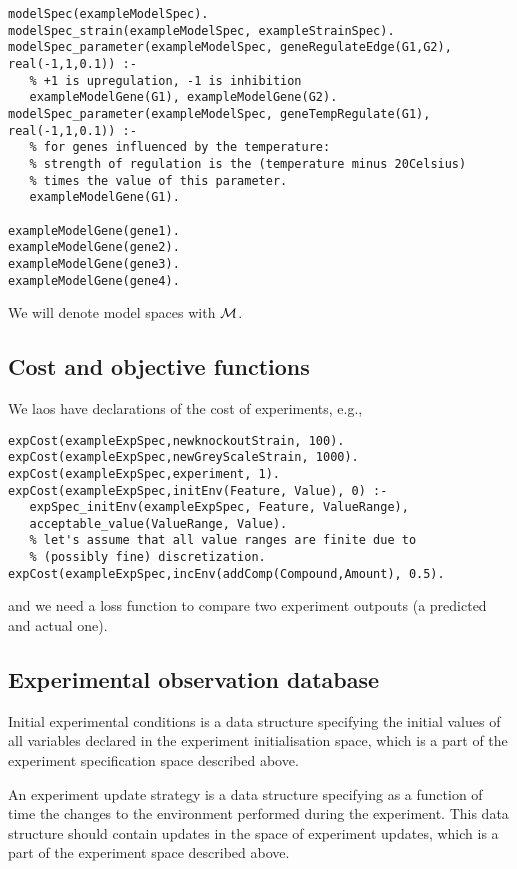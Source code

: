\documentclass{article}
\begin{document}
\begin{verbatim}
modelSpec(exampleModelSpec).
modelSpec_strain(exampleModelSpec, exampleStrainSpec). 
modelSpec_parameter(exampleModelSpec, geneRegulateEdge(G1,G2), real(-1,1,0.1)) :-
   % +1 is upregulation, -1 is inhibition
   exampleModelGene(G1), exampleModelGene(G2).
modelSpec_parameter(exampleModelSpec, geneTempRegulate(G1), real(-1,1,0.1)) :-
   % for genes influenced by the temperature:
   % strength of regulation is the (temperature minus 20Celsius)
   % times the value of this parameter.
   exampleModelGene(G1).

exampleModelGene(gene1).
exampleModelGene(gene2).
exampleModelGene(gene3).
exampleModelGene(gene4).
\end{verbatim}

We will denote model spaces with $\mathcal{M}$.

\subsection{Cost and objective functions}

We laos have declarations of the cost of experiments, e.g.,

\begin{verbatim}
expCost(exampleExpSpec,newknockoutStrain, 100).
expCost(exampleExpSpec,newGreyScaleStrain, 1000).
expCost(exampleExpSpec,experiment, 1).
expCost(exampleExpSpec,initEnv(Feature, Value), 0) :-
   expSpec_initEnv(exampleExpSpec, Feature, ValueRange),
   acceptable_value(ValueRange, Value). 
   % let's assume that all value ranges are finite due to 
   % (possibly fine) discretization.
expCost(exampleExpSpec,incEnv(addComp(Compound,Amount), 0.5).
\end{verbatim}

and we need a loss function to compare two experiment outpouts (a predicted and actual one).

\subsection{Experimental observation database}

Initial experimental conditions is a data structure specifying the initial values of all variables declared in the experiment initialisation space, which is a part of the experiment specification space described above.

An experiment update strategy is a data structure specifying as a function of time the changes to the environment performed during the experiment.  This data structure should contain updates in the space of experiment updates, which is a part of the experiment space described above.
\end{document}
